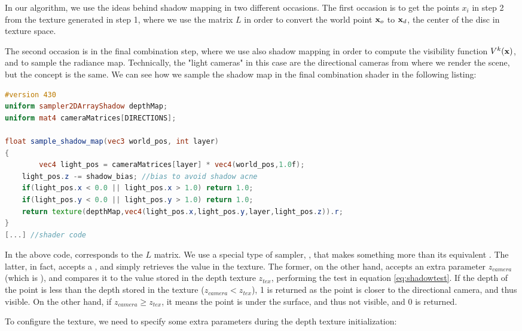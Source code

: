 In our algorithm, we use the ideas behind shadow mapping in two different occasions. The first occasion is to get the points $x_i$ in step 2 from the texture generated in step 1, where we use the matrix $L$ in order to convert the world point $\mathbf{x}_o$ to $\mathbf{x}_d$, the center of the disc in texture space. 

The second occasion is in the final combination step, where we use also shadow mapping in order to compute the visibility function $V^k(\mathbf{x})$, and to sample the radiance map. Technically, the "light cameras" in this case are the directional cameras from where we render the scene, but the concept is the same. We can see how we sample the shadow map in the final combination shader in the following listing:

\begin{lstlisting}[language=GLSL,caption={Sampling of the shadow map texture in step 3 of our method.}]
#version 430
uniform sampler2DArrayShadow depthMap;
uniform mat4 cameraMatrices[DIRECTIONS];

float sample_shadow_map(vec3 world_pos, int layer)
{
		vec4 light_pos = cameraMatrices[layer] * vec4(world_pos,1.0f);
    light_pos.z -= shadow_bias; //bias to avoid shadow acne
    if(light_pos.x < 0.0 || light_pos.x > 1.0) return 1.0;
    if(light_pos.y < 0.0 || light_pos.y > 1.0) return 1.0;
    return texture(depthMap,vec4(light_pos.x,light_pos.y,layer,light_pos.z)).r;
}        
[...] //shader code
\end{lstlisting}

In the above code,  corresponds to the $L$ matrix. We use a special type of sampler, , that makes something more than its equivalent . The latter, in fact, accepts a , and simply retrieves the value in the texture. The former, on the other hand, accepts an extra parameter $z_{camera}$ (which is ), and compares it to the value stored in the depth texture $z_{tex}$, performing the test in equation \ref{eq:shadowtest}. If the depth of the point is less than the depth stored in the texture ($z_{camera} < z_{tex}$), 1 is returned as the point is closer to the directional camera, and thus visible. On the other hand, if $z_{camera} \ge z_{tex}$, it means the point is under the surface, and thus not visible, and 0 is returned.

To configure the  texture, we need to specify some extra parameters during the depth texture initialization:

